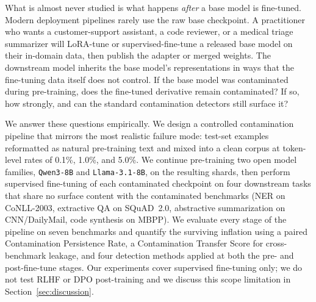 \documentclass{article}
\begin{document}
What is almost never studied is what happens \emph{after} a base model is fine-tuned. Modern deployment pipelines rarely use the raw base checkpoint. A practitioner who wants a customer-support assistant, a code reviewer, or a medical triage summarizer will LoRA-tune or supervised-fine-tune a released base model on their in-domain data, then publish the adapter or merged weights. The downstream model inherits the base model's representations in ways that the fine-tuning data itself does not control. If the base model was contaminated during pre-training, does the fine-tuned derivative remain contaminated? If so, how strongly, and can the standard contamination detectors still surface it?

We answer these questions empirically. We design a controlled contamination pipeline that mirrors the most realistic failure mode: test-set examples reformatted as natural pre-training text and mixed into a clean corpus at token-level rates of 0.1\%, 1.0\%, and 5.0\%. We continue pre-training two open model families, \texttt{Qwen3-8B} and \texttt{Llama-3.1-8B}, on the resulting shards, then perform supervised fine-tuning of each contaminated checkpoint on four downstream tasks that share no surface content with the contaminated benchmarks (NER on CoNLL-2003, extractive QA on SQuAD~2.0, abstractive summarization on CNN/DailyMail, code synthesis on MBPP). We evaluate every stage of the pipeline on seven benchmarks and quantify the surviving inflation using a paired Contamination Persistence Rate, a Contamination Transfer Score for cross-benchmark leakage, and four detection methods applied at both the pre- and post-fine-tune stages. Our experiments cover supervised fine-tuning only; we do not test RLHF or DPO post-training and we discuss this scope limitation in Section~\ref{sec:discussion}.
\end{document}
